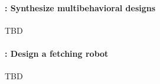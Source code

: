 \documentclass[11pt]{article}
\begin{document}
\paragraph{:  Synthesize multibehavioral designs} 
TBD

\paragraph{:  Design a fetching robot} 
TBD

\end{document}
